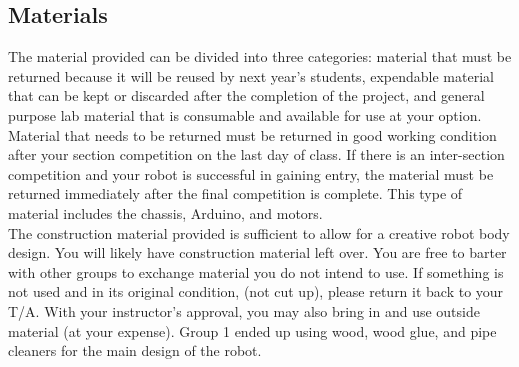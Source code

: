 \documentclass{article}
\begin{document}
\subsection{Materials}
The material provided can be divided into three categories: material that must be returned because it will be reused by next year's students, expendable material that can be kept or discarded after the completion of the project, and general purpose lab material that is consumable and available for use at your option. Material that needs to be returned must be returned in good working condition after your section competition on the last day of class. If there is an inter-section competition and your robot is successful in gaining entry, the material must be returned immediately after the final competition is complete. This type of material includes the chassis, Arduino, and motors. \\

The construction material provided is sufficient to allow for a creative robot body design. You will likely have construction material left over. You are free to barter with other groups to exchange material you do not intend to use. If something is not used and in its original condition, (not cut up), please return it back to your T/A. With your instructor’s approval, you may also bring in and use outside material (at your expense). Group 1 ended up using wood, wood glue, and pipe cleaners for the main design of the robot.
\end{document}
